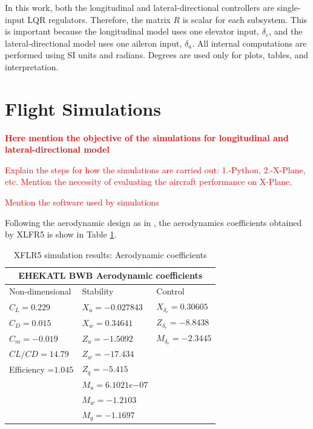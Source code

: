 \documentclass[10pt]{article}
\begin{document}
In this work, both the longitudinal and lateral-directional controllers
are single-input LQR regulators. Therefore, the matrix $R$ is scalar for
each subsystem. This is important because the longitudinal model uses
one elevator input, $\delta_e$, and the lateral-directional model uses
one aileron input, $\delta_a$. All internal computations are performed
using SI units and radians. Degrees are used only for plots, tables, and
interpretation.

\section{Flight Simulations}
\textbf{\textcolor{red}{Here mention the objective of the simulations for longitudinal and lateral-directional model}}

\textcolor{red}{Explain the steps for how the simulations are carried out: 1.-Python, 2.-X-Plane, etc.
Mention the necessity of evaluating the aircraft performance on X-Plane.}

\textcolor{red}{Mention the software used by simulations}

Following the aerodynamic design as in \cite{CCE_Gandhi_22}, the aerodynamics coefficients obtained by XLFR5 is show in Table \ref{tab: EHEKATl Aero coeff}.
%
\begin{table}[htb]
\caption{XFLR5 simulation results: Aerodynamic coefficients }
\centering
\begin{tabular}{ |p{2.3cm}|p{2.4cm}|p{2.1cm}|  }
\hline
\multicolumn{3}{|c|}{EHEKATL BWB Aerodynamic coefficients} \\
\hline
Non-dimensional & Stability & Control \\
\hline
$C_L = 0.229$ & $X_u = -0.027843$ &$X_{\delta_{e}}=0.30605$\\
$C_D = 0.015$ & $X_w = 0.34641$ &$Z_{\delta_{e}}=-8.8438$\\
$C_m = -0.019$ & $Z_u = -1.5092$ &$M_{\delta_{e}}=-2.3445$\\
$CL/CD = 14.79$ &  $Z_w = -17.434$ & \\
Efficiency =$1.045$ & $Z_q = -5.415$ & \\
 & $M_u = 6.1021e{-07}$ &  \\
 & $M_w = -1.2103$ & \\
 & $M_q = -1.1697$ & \\
\hline
\end{tabular}
\label{tab: EHEKATl Aero coeff}
\end{table}
\end{document}
